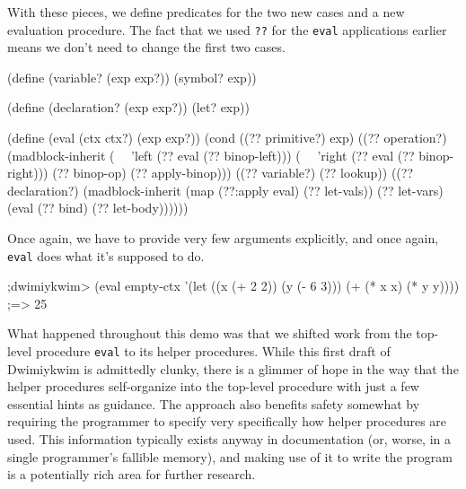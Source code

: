 \documentclass[11pt]{article}
\begin{document}
With these pieces, we define predicates for the two new cases
and a new evaluation procedure.
The fact that we used \texttt{??} for the \texttt{eval} applications earlier
means we don't need to change the first two cases.
\begin{verbbox}
(define (variable? (exp exp?))
  (symbol? exp))

(define (declaration? (exp exp?))
  (let? exp))

(define (eval (ctx ctx?)
              (exp exp?))
  (cond
   ((?? primitive?)
    exp)
   ((?? operation?)
    (madblock-inherit
     (~~ 'left (?? eval (?? binop-left)))
     (~~ 'right (?? eval (?? binop-right)))
     (?? binop-op)
     (?? apply-binop)))
   ((?? variable?)
    (?? lookup))
   ((?? declaration?)
    (madblock-inherit
     (map (??:apply eval) (?? let-vals))
     (?? let-vars)
     (eval (?? bind) (?? let-body))))))
\end{verbbox}
\begin{quote}\theverbbox\end{quote}
Once again, we have to provide very few arguments explicitly,
and once again, \texttt{eval} does what it's supposed to do.
\begin{verbbox}
;dwimiykwim>
(eval
 empty-ctx
 '(let ((x (+ 2 2))
        (y (- 6 3)))
    (+ (* x x) (* y y))))
;=> 25
\end{verbbox}
\begin{quote}\theverbbox\end{quote}

What happened throughout this demo was that we shifted work from
the top-level procedure \texttt{eval} to its helper procedures.
While this first draft of Dwimiykwim is admittedly clunky,
there is a glimmer of hope in the way that the helper procedures
self-organize into the top-level procedure
with just a few essential hints as guidance.
The approach also benefits safety somewhat
by requiring the programmer to specify very specifically
how helper procedures are used.
This information typically exists anyway in documentation
(or, worse, in a single programmer's fallible memory),
and making use of it to write the program
is a potentially rich area for further research.
\end{document}
